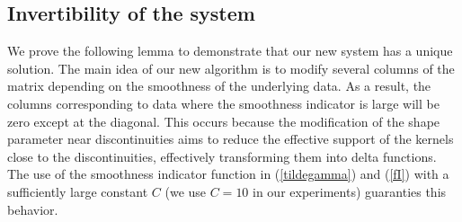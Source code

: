 \documentclass[preprint]{elsarticle}       %
\newtheorem{theorem}{Theorem}[section]
\begin{document}
%

\subsection{Invertibility of the system}

We prove the following lemma to demonstrate that our new system has a unique solution. The main idea of our new algorithm is to modify several columns of the matrix depending on the smoothness of the underlying data. As a result, the columns corresponding to data where the smoothness indicator is large will be zero except at the diagonal. This occurs because the modification of the shape parameter near discontinuities aims to reduce the effective support of the kernels close to the discontinuities, effectively transforming them into delta functions. The use of the smoothness indicator function in (\ref{tildegamma}) and (\ref{fI}) with a sufficiently large constant $C$ (we use $C=10$ in our experiments) guaranties this behavior.
\end{document}

